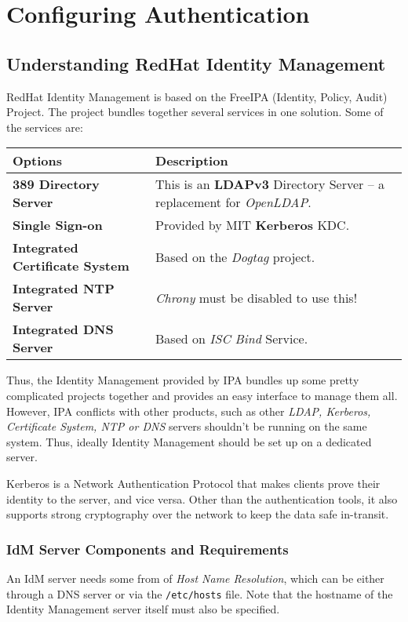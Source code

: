 \chapter{Configuring Authentication}

\section{Understanding RedHat Identity Management}
RedHat Identity Management is based on the FreeIPA (Identity, Policy, Audit) Project. The project bundles together several services in one solution. Some of the services are:

\noindent
\begin{tabular}{lM{0.59}}
	\toprule
	\textbf{Options} &\textbf{Description} \\
	\midrule
	\textbf{389 Directory Server}	&This is an \textbf{LDAPv3} Directory Server -- a replacement for \textit{OpenLDAP}.\\
	\textbf{Single Sign-on}	&Provided by MIT \textbf{Kerberos} KDC.\\
	\textbf{Integrated Certificate System}	&Based on the \textit{Dogtag} project.\\
	\textbf{Integrated NTP Server}	&\textit{Chrony} must be disabled to use this!\\
	\textbf{Integrated DNS Server}	&Based on \textit{ISC Bind} Service.\\
	\bottomrule
\end{tabular}

\noindent
Thus, the Identity Management provided by IPA bundles up some pretty complicated projects together and provides an easy interface to manage them all. However, IPA conflicts with other products, such as other \textit{LDAP, Kerberos, Certificate System, NTP or DNS} servers shouldn't be running on the same system. Thus, ideally Identity Management should be set up on a dedicated server. 

Kerberos is a Network Authentication Protocol that makes clients prove their identity to the server, and vice versa. Other than the authentication tools, it also supports strong cryptography over the network to keep the data safe in-transit. 

\subsection{IdM Server Components and Requirements}
An IdM server needs some from of \textit{Host Name Resolution}, which can be either through a DNS server or via the \verb|/etc/hosts| file. Note that the hostname of the Identity Management server itself must also be specified. 

